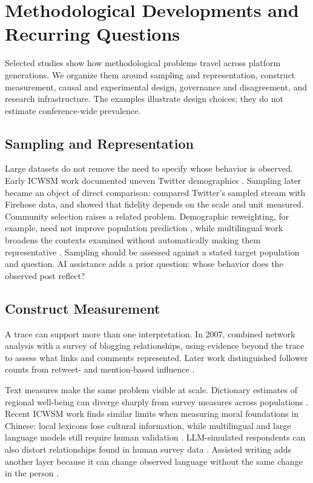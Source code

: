 \section{Methodological Developments and Recurring Questions}
\label{sec:methods_advances}
Selected studies show how methodological problems travel across platform generations. We organize them around sampling and representation, construct measurement, causal and experimental design, governance and disagreement, and research infrastructure. The examples illustrate design choices; they do not estimate conference-wide prevalence.

\subsection{Sampling and Representation}
Large datasets do not remove the need to specify whose behavior is observed. Early ICWSM work documented uneven Twitter demographics \citep{p14168}. Sampling later became an object of direct comparison: \citet{p14401} compared Twitter's sampled stream with Firehose data, and \citet{p7337} showed that fidelity depends on the scale and unit measured. Community selection raises a related problem. Demographic reweighting, for example, need not improve population prediction \citep{p19287}, while multilingual work broadens the contexts examined without automatically making them representative \citep{p19271}. Sampling should be assessed against a stated target population and question. AI assistance adds a prior question: whose behavior does the observed post reflect?

\subsection{Construct Measurement}
A trace can support more than one interpretation. In 2007, \citet{icwsm2007_paper19} combined network analysis with a survey of blogging relationships, using evidence beyond the trace to assess what links and comments represented. Later work distinguished follower counts from retweet- and mention-based influence \citep{p14033}.

Text measures make the same problem visible at scale. Dictionary estimates of regional well-being can diverge sharply from survey measures across populations \citep{jaidka2020estimating}. Recent ICWSM work finds similar limits when measuring moral foundations in Chinese: local lexicons lose cultural information, while multilingual and large language models still require human validation \citep{p42650}. LLM-simulated respondents can also distort relationships found in human survey data \citep{p42652}. Assisted writing adds another layer because it can change observed language without the same change in the person \citep{hohenstein2023}.


